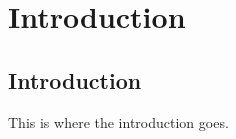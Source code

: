 \chapter{Introduction}
\label{ch:introduction}

\section{Introduction}

This is where the introduction goes.
